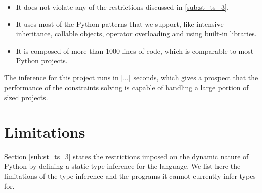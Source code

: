 \begin{itemize}
	\item It does not violate any of the restrictions discussed in \ref{sub:st_ts_3}.
	\item It uses most of the Python patterns that we support, like intensive inheritance, callable objects, operator overloading and using built-in libraries.
	\item It is composed of more than 1000 lines of code, which is comparable to most Python projects.
\end{itemize}
The inference for this project runs in [...] seconds, which gives a prospect that the performance of the constraints solving is capable of handling a large portion of sized projects.

\section{Limitations}
Section \ref{sub:st_ts_3} states the restrictions imposed on the dynamic nature of Python by defining a static type inference for the language. We list here the limitations of the type inference and the programs it cannot currently infer types for.

